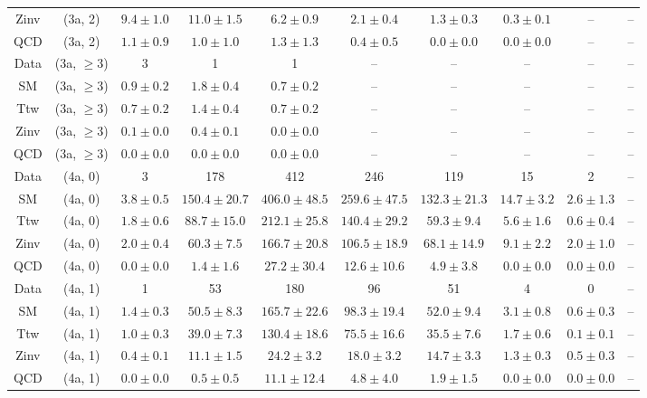 \begin{table}[h!]
{\begin{tabular}{cccccccccc}
	Zinv & (3a, 2) & $9.4\pm 1.0$ & $11.0\pm 1.5$ & $6.2\pm 0.9$ & $2.1\pm 0.4$ & $1.3\pm 0.3$ & $0.3\pm 0.1$ & -- & -- \\[0.5ex] 
	QCD & (3a, 2) & $1.1\pm 0.9$ & $1.0\pm 1.0$ & $1.3\pm 1.3$ & $0.4\pm 0.5$ & $0.0\pm 0.0$ & $0.0\pm 0.0$ & -- & -- \\[0.5ex] 
	Data & (3a, $\ge3$) & 3 & 1 & 1 & -- & -- & -- & -- & -- \\[0.5ex] 
	SM & (3a, $\ge3$) & $0.9\pm 0.2$ & $1.8\pm 0.4$ & $0.7\pm 0.2$ & -- & -- & -- & -- & -- \\[0.5ex] 
	Ttw & (3a, $\ge3$) & $0.7\pm 0.2$ & $1.4\pm 0.4$ & $0.7\pm 0.2$ & -- & -- & -- & -- & -- \\[0.5ex] 
	Zinv & (3a, $\ge3$) & $0.1\pm 0.0$ & $0.4\pm 0.1$ & $0.0\pm 0.0$ & -- & -- & -- & -- & -- \\[0.5ex] 
	QCD & (3a, $\ge3$) & $0.0\pm 0.0$ & $0.0\pm 0.0$ & $0.0\pm 0.0$ & -- & -- & -- & -- & -- \\[0.5ex] 
	Data & (4a, 0) & 3 & 178 & 412 & 246 & 119 & 15 & 2 & -- \\[0.5ex] 
	SM & (4a, 0) & $3.8\pm 0.5$ & $150.4\pm 20.7$ & $406.0\pm 48.5$ & $259.6\pm 47.5$ & $132.3\pm 21.3$ & $14.7\pm 3.2$ & $2.6\pm 1.3$ & -- \\[0.5ex] 
	Ttw & (4a, 0) & $1.8\pm 0.6$ & $88.7\pm 15.0$ & $212.1\pm 25.8$ & $140.4\pm 29.2$ & $59.3\pm 9.4$ & $5.6\pm 1.6$ & $0.6\pm 0.4$ & -- \\[0.5ex] 
	Zinv & (4a, 0) & $2.0\pm 0.4$ & $60.3\pm 7.5$ & $166.7\pm 20.8$ & $106.5\pm 18.9$ & $68.1\pm 14.9$ & $9.1\pm 2.2$ & $2.0\pm 1.0$ & -- \\[0.5ex] 
	QCD & (4a, 0) & $0.0\pm 0.0$ & $1.4\pm 1.6$ & $27.2\pm 30.4$ & $12.6\pm 10.6$ & $4.9\pm 3.8$ & $0.0\pm 0.0$ & $0.0\pm 0.0$ & -- \\[0.5ex] 
	Data & (4a, 1) & 1 & 53 & 180 & 96 & 51 & 4 & 0 & -- \\[0.5ex] 
	SM & (4a, 1) & $1.4\pm 0.3$ & $50.5\pm 8.3$ & $165.7\pm 22.6$ & $98.3\pm 19.4$ & $52.0\pm 9.4$ & $3.1\pm 0.8$ & $0.6\pm 0.3$ & -- \\[0.5ex] 
	Ttw & (4a, 1) & $1.0\pm 0.3$ & $39.0\pm 7.3$ & $130.4\pm 18.6$ & $75.5\pm 16.6$ & $35.5\pm 7.6$ & $1.7\pm 0.6$ & $0.1\pm 0.1$ & -- \\[0.5ex] 
	Zinv & (4a, 1) & $0.4\pm 0.1$ & $11.1\pm 1.5$ & $24.2\pm 3.2$ & $18.0\pm 3.2$ & $14.7\pm 3.3$ & $1.3\pm 0.3$ & $0.5\pm 0.3$ & -- \\[0.5ex] 
	QCD & (4a, 1) & $0.0\pm 0.0$ & $0.5\pm 0.5$ & $11.1\pm 12.4$ & $4.8\pm 4.0$ & $1.9\pm 1.5$ & $0.0\pm 0.0$ & $0.0\pm 0.0$ & -- \\[0.5ex] 

\end{tabular}}
\end{table}
